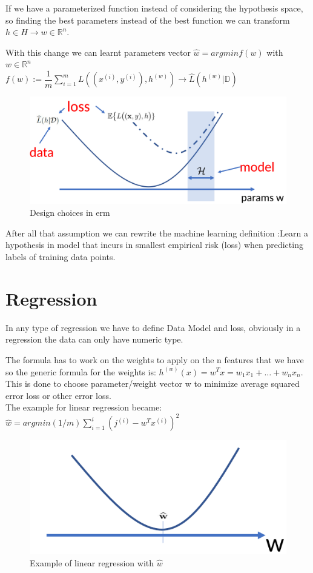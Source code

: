 If we have a parameterized function instead of considering the hypothesis space, so finding the best parameters instead of the best function we can transform $ h \in H \rightarrow w \in \mathbb{R}^n$.
\begin{center}
    With this change we can learnt parameters vector $\hat{w} = argmin f(w)$ with $ w\in \mathbb{R}^n$\\
  $  f(w) := \dfrac{1}{m} \sum\limits_{i=1}^m  L((x^{(i)}, y^{(i)} ),h^{(w)}) \rightarrow \hat{L} (h^{(w)} | \mathbb{D}) $ 
\end{center}
\begin{figure}[H]
    \centering
    \includegraphics[scale=0.15]{images/ERM/ERM2.png}
    \caption{Design choices in erm}
    \label{fig:enter-label}
\end{figure}
 After all that assumption we can rewrite the machine learning definition :Learn a hypothesis in model that incurs in smallest empirical risk (loss) when predicting labels of training data points.
\section{Regression}
In any type of regression we have to define Data Model and loss, obviously in a regression the data can only have numeric type.

The formula has to work on the weights to apply on the n features that we have so the generic formula for the weights is: $ h^{(w)} (x) = w^T x= w_1 x_1+ \dots + w_n x_n$.\\
This is done to choose parameter/weight vector w to minimize average squared error loss or other error loss.\\
The example for linear regression became: $ \hat{w}= argmin (1/m) \sum\limits_{i=1}^i (j^{(i)} - w^T x^(i))^2 $
\begin{figure}[H]
    \centering
    \includegraphics[scale=0.25]{images/ERM/ERm3.png}
    \caption{Example of linear regression with $\hat{w}$}
    \label{fig:enter-label}
\end{figure}

